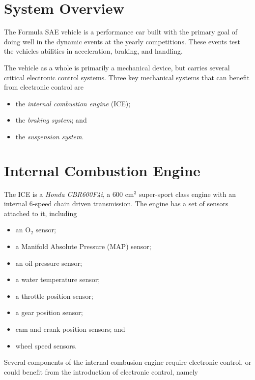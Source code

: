 \documentclass[english]{report}
\begin{document}
\section{System Overview}

The Formula SAE vehicle is a performance car built with the primary goal of doing well in the 
dynamic events at the yearly competitions. These events test the vehicles abilities in acceleration, 
braking, and handling.

The vehicle as a whole is primarily a mechanical device, but carries several critical electronic 
control systems. Three key mechanical systems that can benefit from electronic control are

\begin{itemize}
\item the \emph{internal combustion engine} (ICE); 
\item the \emph{braking system}; and
\item the \emph{suspension system}.
\end{itemize}

\section{Internal Combustion Engine}

The ICE is a \emph{Honda CBR600F4i}, a 600 cm$^3$ super-sport class engine with an internal 6-speed 
chain driven transmission. The engine has a set of sensors attached to it, including

\begin{itemize}
\item an O$_{2}$ sensor;
\item a Manifold Absolute Pressure (MAP) sensor; 
\item an oil pressure sensor;
\item a water temperature sensor;
\item a throttle position sensor;
\item a gear position sensor;
\item cam and crank position sensors; and
\item wheel speed sensors.
\end{itemize}

Several components of the internal combusion engine require electronic control, or could benefit from 
the introduction of electronic control, namely
\end{document}
